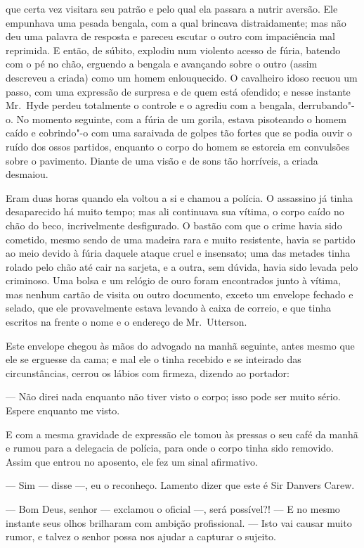 que certa vez visitara seu patrão e pelo qual ela passara a nutrir
aversão.  Ele empunhava uma pesada bengala, com a qual brincava
distraidamente; mas não deu uma palavra de resposta e pareceu escutar o
outro com impaciência mal reprimida.  E então, de súbito, explodiu num
violento acesso de fúria, batendo com o pé no chão, erguendo a bengala
e avançando sobre o outro (assim descreveu a criada) como um homem
enlouquecido.  O cavalheiro idoso recuou um passo, com uma expressão de
surpresa e de quem está ofendido; e nesse instante Mr.~Hyde perdeu
totalmente o controle e o agrediu com a bengala, derrubando"-o.  No
momento seguinte, com a fúria de um gorila, estava pisoteando o homem
caído e cobrindo"-o com uma saraivada de golpes tão fortes que se podia
ouvir o ruído dos ossos partidos, enquanto o corpo do homem se estorcia em
convulsões sobre o pavimento.  Diante de uma visão e de sons tão
horríveis, a criada desmaiou.

Eram duas horas quando ela voltou a si e chamou a polícia.  O assassino
já tinha desaparecido há muito tempo; mas ali continuava sua vítima, o
corpo caído no chão do beco, incrivelmente desfigurado.  O bastão com
que o crime havia sido cometido, mesmo sendo de uma madeira rara e
muito resistente, havia se partido ao meio devido à fúria daquele
ataque cruel e insensato; uma das metades tinha rolado pelo chão até
cair na sarjeta, e a outra, sem dúvida, havia sido levada pelo
criminoso.  Uma bolsa e um relógio de ouro foram encontrados junto à
vítima, mas nenhum cartão de visita ou outro documento, exceto um
envelope fechado e selado, que ele provavelmente estava levando à caixa
de correio, e que tinha escritos na frente o nome e o endereço de Mr.~Utterson.

Este envelope chegou às mãos do advogado na manhã seguinte, antes mesmo
que ele se erguesse da cama; e mal ele o tinha recebido e se inteirado
das circunstâncias, cerrou os lábios com firmeza, dizendo ao portador:

--- Não direi nada enquanto não tiver visto o corpo; isso pode ser muito
sério.  Espere enquanto me visto.

E com a mesma gravidade de expressão ele tomou às pressas o seu café da
manhã e rumou para a delegacia de polícia, para onde o corpo tinha sido		
removido.  Assim que entrou no aposento, ele fez um sinal afirmativo.

--- Sim --- disse ---, eu o reconheço.  Lamento dizer que este é Sir
Danvers Carew. 

--- Bom Deus, senhor --- exclamou o oficial ---, será possível?!  --- E no
mesmo instante seus olhos brilharam com ambição profissional. --- Isto
vai causar muito rumor, e talvez o senhor possa nos ajudar a capturar o
sujeito.


